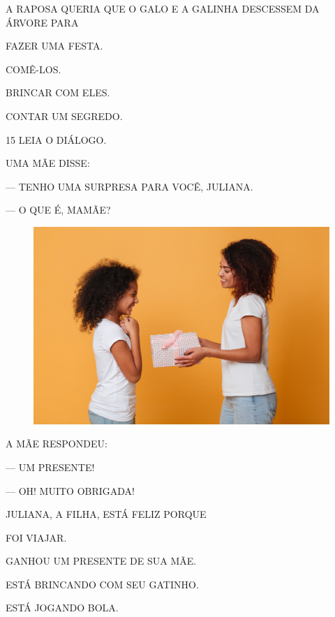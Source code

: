 A RAPOSA QUERIA QUE O GALO E A GALINHA DESCESSEM DA ÁRVORE PARA

\begin{escolha}
\item FAZER UMA FESTA.

\item COMÊ-LOS.

\item BRINCAR COM ELES.

\item CONTAR UM SEGREDO.
\end{escolha}

\pagebreak

\num{15} LEIA O DIÁLOGO. %



\begin{myquote}
UMA MÃE DISSE:

--- TENHO UMA SURPRESA PARA VOCÊ, JULIANA.

--- O QUE É, MAMÃE?
\end{myquote}

\begin{figure}[H]
\centering
\includegraphics[width=.8\textwidth]{media/image259.png}
\end{figure}

\begin{myquote}
A MÃE RESPONDEU:

--- UM PRESENTE!

--- OH! MUITO OBRIGADA!
\end{myquote}

JULIANA, A FILHA, ESTÁ FELIZ PORQUE

\begin{escolha}
\item FOI VIAJAR.

\item GANHOU UM PRESENTE DE SUA MÃE.

\item ESTÁ BRINCANDO COM SEU GATINHO.

\item ESTÁ JOGANDO BOLA.
\end{escolha}


